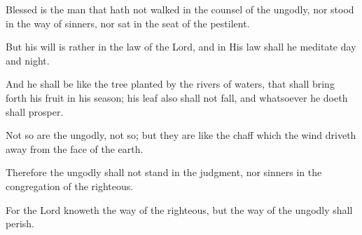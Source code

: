 Blessed is the man that hath not walked in the counsel of the ungodly, nor stood in the way of sinners, nor sat in the seat of the pestilent.

But his will is rather in the law of the Lord, and in His law shall he meditate day and night.

And he shall be like the tree planted by the rivers of waters, that shall bring forth his fruit in his season; his leaf also shall not fall, and whatsoever he doeth shall prosper.

Not so are the ungodly, not so; but they are like the chaff which the wind driveth away from the face of the earth.

Therefore the ungodly shall not stand in the judgment, nor sinners in the congregation of the righteous.

For the Lord knoweth the way of the righteous, but the way of the ungodly shall perish.
